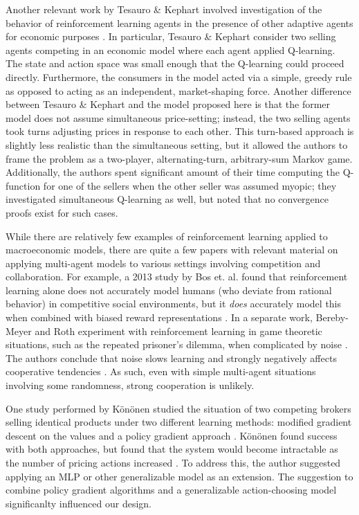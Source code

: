 \documentclass[twoside,twocolumn]{article}
\begin{document}
\medskip

Another relevant work by Tesauro \& Kephart involved investigation of the behavior of reinforcement learning agents in the presence of other adaptive agents for economic purposes \cite{pricing-multi-agent}. In particular, Tesauro \& Kephart consider two selling agents competing in an economic model where each agent applied Q-learning. The state and action space was small enough that the Q-learning could proceed directly. Furthermore, the consumers in the model acted via a simple, greedy rule as opposed to acting as an independent, market-shaping force. Another difference between Tesauro \& Kephart and the model proposed here is that the former model does not assume simultaneous price-setting; instead, the two selling agents took turns adjusting prices in response to each other. This turn-based approach is slightly less realistic than the simultaneous setting, but it allowed the authors to frame the problem as a two-player, alternating-turn, arbitrary-sum Markov game. Additionally, the authors spent significant amount of their time computing the Q-function for one of the sellers when the other seller was assumed myopic; they investigated simultaneous Q-learning as well, but noted that no convergence proofs exist for such cases.

\medskip 

While there are relatively few examples of reinforcement learning applied to macroeconomic models, there are quite a few papers with relevant material on applying multi-agent models to various settings involving competition and collaboration. For example, a 2013 study by Bos et. al. found that reinforcement learning alone does not accurately model humans (who deviate from rational behavior) in competitive social environments, but it \textit{does} accurately model this when combined with biased reward representations \cite{vandenBos2137}. In a separate work, Bereby-Meyer and Roth experiment with reinforcement learning in game theoretic situations, such as the repeated prisoner's dilemma, when complicated by noise \cite{10.1257/aer.96.4.1029}. The authors conclude that noise slows learning and strongly negatively affects cooperative tendencies \cite{10.1257/aer.96.4.1029}. As such, even with simple multi-agent situations involving some randomness, strong cooperation is unlikely.

\medskip

One study performed by K\"on\"onen studied the situation of two competing brokers selling identical products under two different learning methods: modified gradient descent on the values and a policy gradient approach \cite{doi:10.1002/int.20121}. K\"on\"onen found success with both approaches, but found that the system would become intractable as the number of pricing actions increased \cite{doi:10.1002/int.20121}. To address this, the author suggested applying an MLP or other generalizable model as an extension. The suggestion to combine policy gradient algorithms and a generalizable action-choosing model significanlty influenced our design. 
\end{document}
